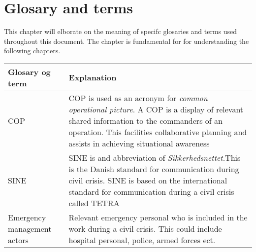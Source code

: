 \label{chp_revisionHistory}
\chapter{Glosary and terms}

This chapter will elborate on the meaning of specifc glosaries and terms used throughout this document. The chapter is fundamental for for understanding the following chapters.

\begin{longtable}{| p{3.5cm} |  p{10cm} | }
	\hline
	\textbf{Glosary og term} &  \textbf{Explanation } \\
	\hline
	COP & COP is used as an acronym for \emph{common operational picture}. A COP is a display of relevant shared information to the commanders of an operation. This facilities collaborative planning and assists in achieving situational awareness \\
	\hline
	SINE & SINE is and abbreviation of \emph{Sikkerhedsnettet}.This is the Danish standard for communication during civil crisis. SINE is based on the international standard for communication during a civil crisis called TETRA\\
	\hline
	Emergency management actors & Relevant emergency personal who is included in the work during a civil crisis. This could include hospital personal, police, armed forces ect.  \\
	\hline
\end{longtable}